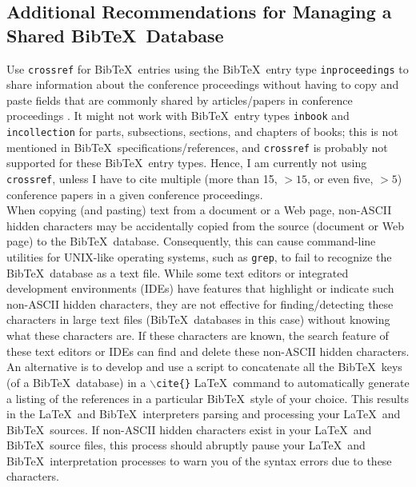 \documentclass[letter,12pt]{article}
\begin{document}
\subsection{Additional Recommendations for Managing a Shared {\sc Bib}\TeX\ Database}
\label{ssec:AdditionalRecommendationsForManagingASharedBibTeXDatabase}



Use {\tt crossref} for {\sc Bib}\TeX\ entries using the {\sc Bib}\TeX\ entry type {\tt inproceedings} to share information about the conference proceedings without having to copy and paste fields that are commonly shared by articles/papers in conference proceedings \cite[\S12.2.3, pp. 234]{Kopka2004}. It might not work with {\sc Bib}\TeX\ entry types {\tt inbook} and {\tt incollection} for parts, subsections, sections, and chapters of books; this is not mentioned in {\sc Bib}\TeX\ specifications/references, and {\tt crossref} is probably not supported for these {\sc Bib}\TeX\ entry types. Hence, I am currently not using {\tt crossref}, unless I have to cite multiple (more than 15, $>15$, or even five, $>5$) conference papers in a given conference proceedings. \\



When copying (and pasting) text from a document or a Web page, non-ASCII hidden characters may be accidentally copied from the source (document or Web page) to the {\sc Bib}\TeX\ database. Consequently, this can cause command-line utilities for UNIX-like operating systems, such as {\tt grep}, to fail to recognize the {\sc Bib}\TeX\ database as a text file. While some text editors or integrated development environments (IDEs) have features that highlight or indicate such non-ASCII hidden characters, they are not effective for finding/detecting these characters in large text files ({\sc Bib}\TeX\ databases in this case) without knowing what these characters are. If these characters are known, the search feature of these text editors or IDEs can find and delete these non-ASCII hidden characters. \\

An alternative is to develop and use a script to concatenate all the {\sc Bib}\TeX\ keys (of a {\sc Bib}\TeX\ database) in a {\tt $\backslash$cite\{\}} \LaTeX\ command to automatically generate a listing of the references in a particular {\sc Bib}\TeX\ style of your choice. This results in the \LaTeX\ and {\sc Bib}\TeX\ interpreters parsing and processing your \LaTeX\ and {\sc Bib}\TeX\ sources. If non-ASCII hidden characters exist in your \LaTeX\ and {\sc Bib}\TeX\ source files, this process should abruptly pause your \LaTeX\ and {\sc Bib}\TeX\ interpretation processes to warn you of the syntax errors due to these characters. \\
\end{document}
